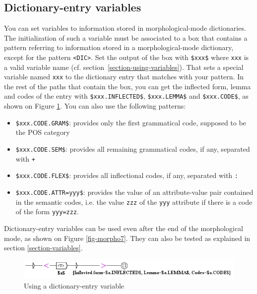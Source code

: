 \subsection{Dictionary-entry variables}
\label{dictionary-variables}
You can set variables to information stored in morphological-mode dictionaries.
The initialization of such a variable must be associated to a box that contains
a pattern referring to information stored in a morphological-mode dictionary,
except for the pattern \verb+<DIC>+. Set the output of the box with
\verb+$xxx$+ where \verb+xxx+ is a valid variable name (cf. section~\ref{section-using-variables}). That sets a
special variable named \verb+xxx+ to the dictionary entry that 
matches with your pattern. In the rest of the paths that contain the
box, you can get the inflected form, lemma and codes
of the entry with \verb+$xxx.INFLECTED$+, \verb+$xxx.LEMMA$+ and
\verb+$xxx.CODE$+, as shown on Figure \ref{fig-morpho5}. You can also use the
following patterns:
\begin{itemize}
  \item \verb+$xxx.CODE.GRAM$+: provides only the first grammatical code,
  supposed to be the POS category
  
  \item \verb+$xxx.CODE.SEM$+: provides all remaining grammatical codes, if any,
  separated with \verb$+$
  
  \item \verb+$xxx.CODE.FLEX$+: provides all inflectional codes, if
  any, separated with \verb$:$

  \item \verb+$xxx.CODE.ATTR=yyy$+: provides the value of an attribute-value pair contained in the semantic codes,
i.e. the value \verb+zzz+ of the \verb+yyy+ attribute if there is a code of the form \verb+yyy=zzz+.

\end{itemize}

\noindent Dictionary-entry variables can be used even after the end of the
morphological mode, as shown on Figure \ref{fig-morpho7}. They can also be
tested as explained in section \ref{section-variables}.
 
\begin{figure}[!ht]
\begin{center}
\includegraphics[width=16cm]{resources/img/fig6-17o.png}
\caption{Using a dictionary-entry variable\label{fig-morpho5}}
\end{center}
\end{figure}


